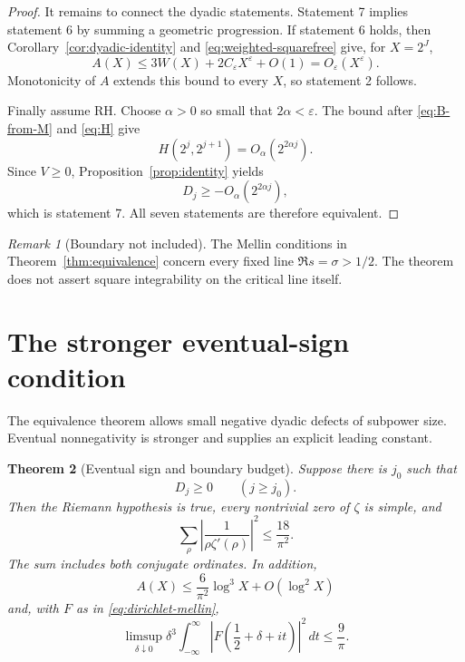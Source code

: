 \documentclass[11pt,a4paper]{amsart}
\newtheorem{theorem}{Theorem}[section]
\theoremstyle{definition}
\theoremstyle{remark}
\newtheorem{remark}[theorem]{Remark}
\begin{document}
\begin{proof}
It remains to connect the dyadic statements.  Statement 7 implies statement
6 by summing a geometric progression.  If statement 6 holds, then
Corollary~\ref{cor:dyadic-identity} and \eqref{eq:weighted-squarefree} give,
for $X=2^J$,
\[
 A(X)\leq 3W(X)+2C_\varepsilon X^\varepsilon+O(1)
 =O_\varepsilon(X^\varepsilon).
\]
Monotonicity of $A$ extends this bound to every $X$, so statement 2 follows.

Finally assume RH.  Choose $\alpha>0$ so small that $2\alpha<\varepsilon$.
The bound after \eqref{eq:B-from-M} and \eqref{eq:H} give
\[
 H(2^j,2^{j+1})=O_\alpha(2^{2\alpha j}).
\]
Since $V\geq0$, Proposition~\ref{prop:identity} yields
\[
 D_j\geq-O_\alpha(2^{2\alpha j}),
\]
which is statement 7.  All seven statements are therefore equivalent.
\end{proof}

\begin{remark}[Boundary not included]\label{rem:boundary}
The Mellin conditions in Theorem~\ref{thm:equivalence} concern every fixed
line $\Re s=\sigma>1/2$.  The theorem does not assert square integrability
on the critical line itself.
\end{remark}

\section{The stronger eventual-sign condition}

The equivalence theorem allows small negative dyadic defects of subpower
size.  Eventual nonnegativity is stronger and supplies an explicit leading
constant.

\begin{theorem}[Eventual sign and boundary budget]\label{thm:eventual}
Suppose there is $j_0$ such that
\begin{equation}\label{eq:eventual}
 D_j\geq0\qquad(j\geq j_0).
\end{equation}
Then the Riemann hypothesis is true, every nontrivial zero of $\zeta$ is
simple, and
\begin{equation}\label{eq:budget}
 \sum_\rho\left|\frac{1}{\rho\zeta'(\rho)}\right|^2
 \leq\frac{18}{\pi^2}.
\end{equation}
The sum includes both conjugate ordinates.  In addition,
\begin{equation}\label{eq:A-sharp}
 A(X)\leq\frac{6}{\pi^2}\log^3X+O(\log^2X)
\end{equation}
and, with $F$ as in \eqref{eq:dirichlet-mellin},
\begin{equation}\label{eq:hardy-ceiling}
 \limsup_{\delta\downarrow0}\delta^3
 \int_{-\infty}^{\infty}
 \left|F\left(\frac12+\delta+it\right)\right|^2\,dt
 \leq\frac{9}{\pi}.
\end{equation}
\end{theorem}
\end{document}
